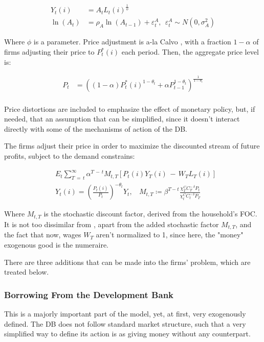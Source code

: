 \documentclass[12pt]{article}
\begin{document}
\begin{align*}
    Y_t(i) &= A_tL_t(i)^{\frac{1}{\phi}}\\
    \ln(A_t) &= \rho_A\ln(A_{t-1}) + \varepsilon_t^A, ~~ \varepsilon_t^A \sim N(0, \sigma^2_A)
\end{align*}

Where $\phi$ is a parameter. Price adjustment is a-la Calvo \cite{calvo_1983}, with a fraction $1 - \alpha$ of firms adjusting their price to $P^*_t(i)$ each period. Then, the aggregate price level is:

\begin{align*}
    P_t &= \left((1-\alpha)P^*_t(i)^{1-\theta_t} + \alpha P_{t-1}^{1-\theta_t}\right)^\frac{1}{1-\theta_t}\\
\end{align*}

Price distortions are included to emphasize the effect of monetary policy, but, if needed, that an assumption that can be simplified, since it doesn't interact directly with some of the mechanisms of action of the DB.

The firms adjust their price in order to maximize the discounted stream of future profits, subject to the demand constrains:

\begin{align*}
    &E_{t}\sum_{T\,=\,t}^{\infty}\alpha^{T\,-\,t}M_{t,T}[P_{t}(i)Y_{T}(i)\,-\,W_{T}L_{T}(i)]\\
    &Y_{t}(i) = \left(\frac{P_{t}(i)}{P_{t}}\right)^{-\theta_{t}}Y_{t}, ~~~~ M_{t,T} \coloneqq \beta^{T-t}\frac{\chi_{T}^{C}C_{T}^{-\,\delta}P_{t}}{\chi_{t}^{C}C_{t}^{-\,\delta}P_{T}}
\end{align*}

Where $M_{t,T}$ is the stochastic discount factor, derived from the household's FOC. It is not too dissimilar from \cite{hopenhayn_1993}, apart from the added stochastic factor $M_{t,T}$, and the fact that now, wages $W_T$ aren't normalized to 1, since here, the "money" exogenous good is the numeraire.

There are three additions that can be made into the firms' problem, which are treated below.


\subsubsection{Borrowing From the Development Bank}

This is a majorly important part of the model, yet, at first, very exogenously defined. The DB does not follow standard market structure, such that a very simplified way to define its action is as giving money without any counterpart.
\end{document}
